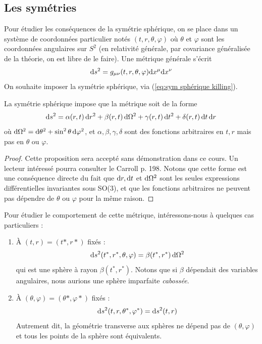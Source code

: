 \subsection{Les symétries}
Pour étudier les conséquences de la symétrie sphérique, on se place dans un système de coordonnées particulier notés $(t,r,\theta,\varphi)$ où $\theta$ et $\varphi$ sont les coordonnées angulaires sur $S^2$ (en relativité générale, par covariance généralisée de la théorie, on est libre de le faire). Une métrique générale s'écrit
\begin{equation}
    \mathrm{d} s^2 = g_{\mu\nu}(t,r,\theta,\varphi) \mathrm{d} x^\mu \mathrm{d} x^\nu
\end{equation}
On souhaite imposer la symétrie sphérique, via (\ref{eq:sym sphérique killing}).
\begin{theoremframe}
    \begin{prop}
        La symétrie sphérique impose que la métrique soit de la forme
        \begin{equation}
            \label{def: métrique à symétrie sphérique}
            \mathrm{d} s^2 = \alpha (r,t)\, \mathrm{d} r^2 + \beta (r,t)\, \mathrm{d} \Omega^2 + \gamma(r,t) \,\mathrm{d} t^2 + \delta (r,t) \, \mathrm{d} t \,\mathrm{d} r
        \end{equation}
        où $\mathrm{d} \Omega^2 = \mathrm{d} \theta^2 + \sin^2\theta \, \mathrm{d} \varphi^2$, et $\alpha,\beta,\gamma,\delta$ sont des fonctions arbitraires en $t,r$ mais pas en $\theta$ ou $\varphi$.
    \end{prop}
\end{theoremframe}
\begin{proof}
    Cette proposition sera accepté sans démonstration dans ce cours. Un lecteur intéressé pourra consulter le Carroll p. 198.
    Notons que cette forme est une conséquence directe du fait que $\mathrm{d} r, \mathrm{d} t$ et $\mathrm{d}\Omega^2$ sont les seules expressions différentielles invariantes sous SO(3), et que les fonctions arbitraires ne peuvent pas dépendre de $\theta$ ou $\varphi$ pour la même raison.
\end{proof}
Pour étudier le comportement de cette métrique, intéressons-nous à quelques cas particuliers :
\begin{enumerate}
    \item À $(t,r) = (t*,r*)$ fixés :
    \begin{equation}
        \mathrm{d} s^2 (t^*,r^*,\theta,\varphi ) = \beta (t^*,r^*) \, \mathrm{d} \Omega^2
    \end{equation}
    qui est une sphère à rayon $\beta (t^*,r^*)$. Notons que si $\beta$ dépendait des variables angulaires, nous aurions une sphère imparfaite \emph{cabossée}.
    \item À $(\theta,\varphi) = (\theta*,\varphi*)$ fixés :
    \begin{equation}
        \mathrm{d} s^2 (t,r,\theta^*,\varphi^*) = \mathrm{d} s^2 (t,r)
    \end{equation}
    Autrement dit, la géométrie transverse aux sphères ne dépend pas de $(\theta,\varphi)$ et tous les points de la sphère sont équivalents.
\end{enumerate}
